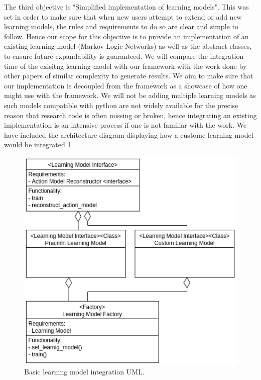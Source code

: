 The third objective is "Simplified implementation of learning models".
This was set in order to make sure that when new users attempt to extend or add new learning models, the rules and requirements to do so are clear and simple to follow.
Hence our scope for this objective is to provide an implementation of an existing learning model (Markov Logic Networks) as well as the abstract classes, to ensure future expandability is guaranteed. We will compare the integration time of the exisitng learning model with our framework with the work done by other papers of similar complexity to generate results.
We aim to make sure that our implementation is decoupled from the framework as a showcase of how one might use with the framework.
We will not be adding multiple learning models as such models compatible with python are not widely available for the precise reason that research code is often missing or broken, hence integrating an existing implementation is an intensive process if one is not familiar with the work.
We have included the architecture diagram displaying how a custome learning model would be integrated \ref{fig:learning-model-uml}
\begin{figure}[h]
    \centering
    \includegraphics[width=0.7\linewidth]{images/architecture/learning_model_uml}
    \caption{Basic learning model integration UML.}
    \label{fig:learning-model-uml}
\end{figure}

